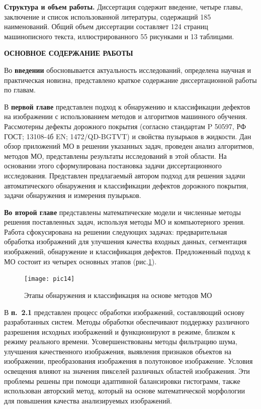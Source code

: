 \textbf{Структура и объем работы.} Диссертация содержит введение, четыре главы, заключение и список использованной литературы, содержащий 185 наименований. Общий объем диссертации составляет 124 страниц машинописного текста, иллюстрированного 55 рисунками и 13 таблицами.
\begin{center}
\textbf{ОСНОВНОЕ СОДЕРЖАНИЕ РАБОТЫ}
\end{center}

Во {\textbf{введении}} обосновывается актуальность исследований, определена научная и практическая новизна, представлено краткое содержание диссертационной работы по главам.

В \textbf {первой главе} представлен подход к обнаружению и классификации дефектов на изображении с использованием методов и алгоритмов машинного обучения. Рассмотерны дефекты дорожного покрытия (согласно стандартам P 50597, РФ ГОСТ; 13108-4б EN; 1472/QD-BGTVT) и свойства пузырьков в жидкости. Дан обзор приложений МО в решении указанных задач, проведен анализ алгоритмов, методов МО, представлены результаты исследований в этой области. На основании этого сформулирована постановка задачи диссертационного исследования. Представлен предлагаемый автором подход для решения задачи автоматического обнаружения и классификации дефектов дорожного покрытия, задачи обнаружения и измерения пузырьков.

 \textbf{Во второй главе} представлены математические модели и численные методы решения поставленных задач, используя методы МО и компьютерного зрения. Работа сфокусирована на решении следующих задачах: предварительная обработка изображений для улучшения качества входных данных, сегментация изображений, обнаружение и классификация дефектов. Предложенный подход к МО состоит из четырех основных этапов (рис.\ref{pic14}).

\begin{figure}[ht!]
\centering
\texttt{[image: pic14]}
\caption{Этапы обнаружения и классификация на основе методов МО}
	\label{pic14}
	\end{figure}

В \textbf{п.~2.1} представлен процесс обработки изображений, составляющий основу разработанных систем. Методы обработки обеспечивают поддержку различного разрешения исходных изображений и функционируют в режиме, близком к режиму реального времени. Усовершенствованы методы фильтрацию шума, улучшения качественного изображения, выявления признаков объектов на изображении, преобразования изображения в полутоновое изображение. Условия освещения влияют на значения пикселей различных областей изображения. Эти проблемы решены при помощи адаптивной балансировки гистограмм, также использован авторский метод, который на основе математической морфологии для повышения качества анализируемых изображений.

